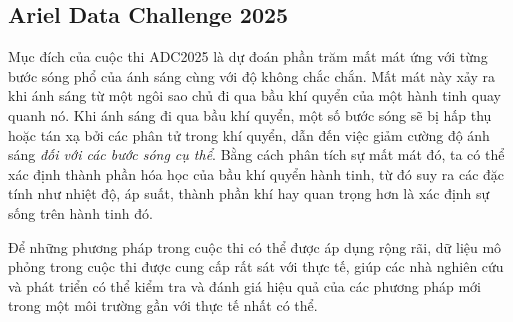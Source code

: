\subsection{Ariel Data Challenge 2025}

Mục đích của cuộc thi ADC2025 là dự đoán phần trăm mất mát ứng với từng bước sóng phổ của ánh sáng cùng với
độ không chắc chắn. Mất mát này xảy ra khi ánh sáng từ một ngôi sao chủ đi qua bầu khí quyển của một hành 
tinh quay quanh nó. Khi ánh sáng đi qua bầu khí quyển, một số bước sóng sẽ bị hấp thụ hoặc tán xạ bởi các
phân tử trong khí quyển, dẫn đến việc giảm cường độ ánh sáng \textit{đối với các bước sóng cụ thể}. Bằng cách
phân tích sự mất mát đó, ta có thể xác định thành phần hóa học của bầu khí quyển hành tinh, từ đó suy ra các
đặc tính như nhiệt độ, áp suất, thành phần khí hay quan trọng hơn là xác định sự sống trên hành tinh đó. 

Để những phương pháp trong cuộc thi có thể được áp dụng rộng rãi, dữ liệu mô phỏng trong cuộc thi được cung cấp
rất sát với thực tế, giúp các nhà nghiên cứu và phát triển có thể kiểm tra và đánh giá hiệu quả của các phương pháp
mới trong một môi trường gần với thực tế nhất có thể.